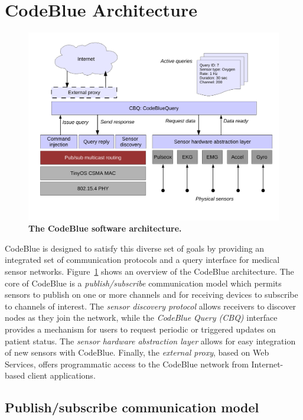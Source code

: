 \section{CodeBlue Architecture}

\begin{figure}[t]
\begin{center}
\includegraphics[width=0.95\hsize]{./figures/codeblue/cbarch.pdf}
\end{center}
\caption{\small {\bf The CodeBlue software architecture.}}
\label{fig-codeblue-arch}
\end{figure}

CodeBlue is designed to satisfy this diverse set of goals by providing
an integrated set of communication protocols and a query interface for
medical sensor networks. Figure~\ref{fig-codeblue-arch} shows an
overview of the CodeBlue architecture. The core of CodeBlue is a {\em
publish/subscribe} communication model which permits sensors to
publish on one or more channels and for receiving devices to subscribe
to channels of interest.  The {\em sensor discovery protocol} allows
receivers to discover nodes as they join the network, while the {\em
CodeBlue Query (CBQ)} interface provides a mechanism for users to
request periodic or triggered updates on patient status.  The {\em
sensor hardware abstraction layer} allows for easy integration of new
sensors with CodeBlue.  Finally, the {\em external proxy}, based on
Web Services, offers programmatic access to the CodeBlue network from
Internet-based client applications.

\subsection{Publish/subscribe communication model}

